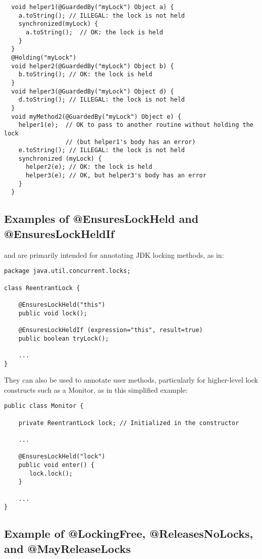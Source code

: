 \begin{Verbatim}
  void helper1(@GuardedBy("myLock") Object a) {
    a.toString(); // ILLEGAL: the lock is not held
    synchronized(myLock) {
      a.toString();  // OK: the lock is held
    }
  }
  @Holding("myLock")
  void helper2(@GuardedBy("myLock") Object b) {
    b.toString(); // OK: the lock is held
  }
  void helper3(@GuardedBy("myLock") Object d) {
    d.toString(); // ILLEGAL: the lock is not held
  }
  void myMethod2(@GuardedBy("myLock") Object e) {
    helper1(e);  // OK to pass to another routine without holding the lock
                 // (but helper1's body has an error)
    e.toString(); // ILLEGAL: the lock is not held
    synchronized (myLock) {
      helper2(e); // OK: the lock is held
      helper3(e); // OK, but helper3's body has an error
    }
  }
\end{Verbatim}


\subsection{Examples of @EnsuresLockHeld and @EnsuresLockHeldIf\label{ensureslockheld-examples}}

 and  are primarily intended
for annotating JDK locking methods, as in:

\begin{Verbatim}
package java.util.concurrent.locks;

class ReentrantLock {

    @EnsuresLockHeld("this")
    public void lock();

    @EnsuresLockHeldIf (expression="this", result=true)
    public boolean tryLock();

    ...
}
\end{Verbatim}

They can also be used to annotate user methods, particularly for
higher-level lock constructs such as a Monitor, as in this simplified example:

\begin{Verbatim}
public class Monitor {

    private ReentrantLock lock; // Initialized in the constructor

    ...

    @EnsuresLockHeld("lock")
    public void enter() {
       lock.lock();
    }

    ...
}
\end{Verbatim}

\subsection{Example of @LockingFree, @ReleasesNoLocks, and @MayReleaseLocks\label{lock-lockingfree-example}}

